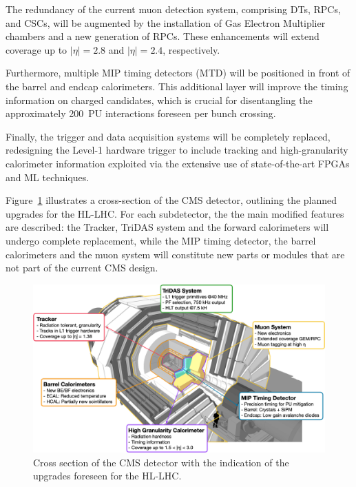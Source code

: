 The redundancy of the current muon detection system, comprising DTs, RPCs, and CSCs, will be augmented by the installation of Gas Electron Multiplier chambers and a new generation of RPCs. These enhancements will extend coverage up to $|\eta|=2.8$ and $|\eta|=2.4$, respectively.

Furthermore, multiple MIP timing detectors (MTD) will be positioned in front of the barrel and endcap calorimeters. This additional layer will improve the timing information on charged candidates, which is crucial for disentangling the approximately 200~PU interactions foreseen per bunch crossing.

Finally, the trigger and data acquisition systems will be completely replaced, redesigning the Level-1 hardware trigger to include tracking and high-granularity calorimeter information exploited via the extensive use of state-of-the-art FPGAs and ML techniques.

\bigbreak

Figure~\ref{fig:CMSUpgrade} illustrates a cross-section of the CMS detector, outlining the planned upgrades for the HL-LHC. For each subdetector, the the main modified features are described: the Tracker, TriDAS system and the forward calorimeters will undergo complete replacement, while the MIP timing detector, the barrel calorimeters and the muon system will constitute new parts or modules that are not part of the current CMS design.

\begin{figure}
    \centering
    \includegraphics[width=0.95\linewidth]{Figures/HGCAL/CMSUpgrades.pdf}
    \caption{Cross section of the CMS detector with the indication of the upgrades foreseen for the HL-LHC.}
    \label{fig:CMSUpgrade}
\end{figure}

